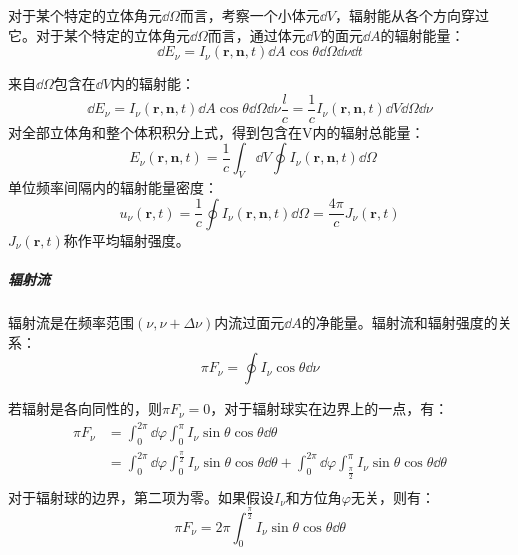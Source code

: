 对于某个特定的立体角元$\dd \Omega$而言，考察一个小体元$\dd V$，辐射能从各个方向穿过它。对于某个特定的立体角元$\dd \Omega$而言，通过体元$\dd V$的面元$\dd A$的辐射能量：
\begin{equation}
	\dd E_{\nu}=I_{\nu}\left(\boldsymbol{r},\boldsymbol{n},t\right)\dd A \cos \theta \dd \Omega\dd \nu \dd t
\end{equation}

来自$\dd \Omega$包含在$\dd V$内的辐射能：
\begin{equation}
	\dd E_{\nu}=I_{\nu}\left(\boldsymbol{r},\boldsymbol{n},t\right)\dd A \cos \theta \dd \Omega\dd \nu \frac{l}{c}=\frac{1}{c}I_{\nu}\left(\boldsymbol{r},\boldsymbol{n},t\right)\dd V\dd \Omega \dd \nu
\end{equation}
对全部立体角和整个体积积分上式，得到包含在V内的辐射总能量：
\begin{equation}
	E_{\nu}\left(\boldsymbol{r},\boldsymbol{n},t\right)=\frac{1}{c}\int_{V}\dd V\oint I_{\nu}\left(\boldsymbol{r},\boldsymbol{n},t\right)\dd \Omega\quad
\end{equation}
单位频率间隔内的辐射能量密度：
\begin{equation}
	u_{\nu}\left(\boldsymbol{r},t\right)=\frac{1}{c}\oint I_{\nu}\left(\boldsymbol{r},\boldsymbol{n},t\right)\dd \Omega=\frac{4\pi}{c}J_{\nu}\left(\boldsymbol{r},t\right)
\end{equation}
$J_{\nu}\left(\boldsymbol{r},t\right)$称作平均辐射强度。
\subparagraph{辐射流}
辐射流是在频率范围$\left(\nu ,\nu+\Delta \nu\right)$内流过面元$\dd A $的净能量。辐射流和辐射强度的关系：
\begin{equation}
	\pi F_{\nu}=\oint I_{\nu}\cos \theta\dd\nu
\end{equation}

若辐射是各向同性的，则$\pi F_{\nu}=0$，对于辐射球实在边界上的一点，有：
\begin{equation}
	\begin{split}
		\pi F_{\nu}&=\int_{0}^{2\pi}\dd \varphi\int_{0}^{\pi}I_{\nu}\sin \theta\cos \theta \dd \theta\\
		&=\int_{0}^{2\pi}\dd \varphi\int_{0}^{\frac{\pi}{2}}I_{\nu}\sin \theta\cos \theta \dd \theta+\int_{0}^{2\pi}\dd \varphi\int_{\frac{\pi}{2}}^{\pi}I_{\nu}\sin \theta\cos \theta \dd \theta\\
	\end{split}
\end{equation}
对于辐射球的边界，第二项为零。如果假设$I_{\nu}$和方位角$\varphi$无关，则有：
\begin{equation}
	\pi F_{\nu}=2\pi \int_{0}^{\frac{\pi}{2}}I_{\nu}\sin \theta\cos \theta\dd \theta
\end{equation}

